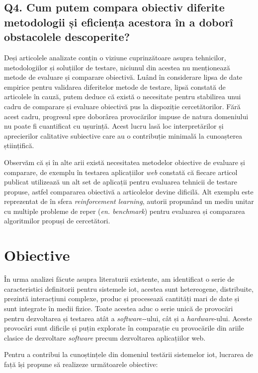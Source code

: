 \subsection*{Q4. Cum putem compara obiectiv diferite metodologii și eficiența acestora în a doborî obstacolele descoperite?}

Deși articolele analizate conțin o viziune cuprinzătoare asupra tehnicilor, metodologiilor și soluțiilor de testare, niciunul din acestea nu menționează metode de evaluare și comparare obiectivă. Luând în considerare lipsa de date empirice pentru validarea diferitelor metode de testare, lipsă constată de articolele în cauză, putem deduce că există o necesitate pentru stabilirea unui cadru de comparare și evaluare obiectivă pus la dispoziție cercetătorilor. Fără acest cadru, progresul spre doborârea provocărilor impuse de natura domeniului nu poate fi cuantificat cu ușurință. Acest lucru lasă loc interpretărilor și aprecierilor calitative subiective care au o contribuție minimală la cunoașterea științifică.

Observăm că și în alte arii există necesitatea metodelor obiective de evaluare și comparare, de exemplu în testarea aplicațiilor \textit{web} \cite{Garousi2013} constată că fiecare articol publicat utilizează un alt set de aplicații pentru evaluarea tehnicii de testare propuse, astfel compararea obiectivă a articolelor devine dificilă. Alt exemplu este reprezentat de \cite{Brockman2016} în sfera \textit{reinforcement learning}, autorii propunând un mediu unitar cu multiple probleme de reper (\textit{en. benchmark}) pentru evaluarea și compararea algoritmilor propuși de cercetători.

\section{Obiective}

În urma analizei făcute asupra literaturii existente, am identificat o serie de caracteristici definitorii pentru sistemele \acrlong{iot}, acestea sunt hetereogene, distribuite, prezintă interacțiuni complexe, produc și procesează cantități mari de date și sunt integrate în medii fizice. Toate acestea aduc o serie unică de provocări pentru dezvoltarea și testarea atât a \textit{software-}-ului, cât și a \textit{hardware}-ului. Aceste provocări sunt dificile și puțin explorate în comparație cu provocările din ariile clasice de dezvoltare \textit{software} precum dezvoltarea aplicațiilor web. 

Pentru a contribui la cunoștințele din domeniul testării sistemelor \acrshort{iot}, lucrarea de față își propune să realizeze următoarele obiective:

